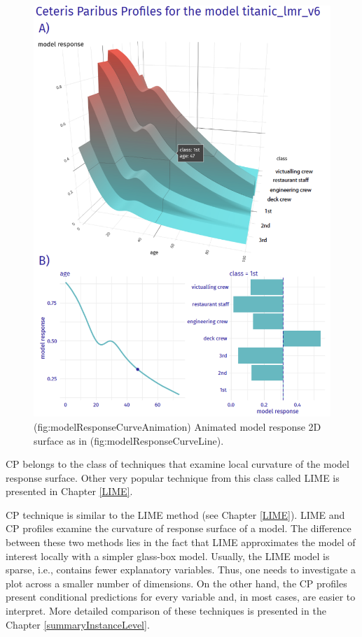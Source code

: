 \documentclass[12pt,]{krantz}
\begin{document}
\begin{figure}

{\centering \includegraphics[width=0.7\linewidth]{figure/profile_age_class} 

}

\caption{(fig:modelResponseCurveAnimation) Animated model response 2D surface as in (fig:modelResponseCurveLine).}\label{fig:modelResponseCurveAnimation}
\end{figure}

CP belongs to the class of techniques that examine local curvature of the model response surface. Other very popular technique from this class called LIME is presented in Chapter \ref{LIME}.

CP technique is similar to the LIME method (see Chapter \ref{LIME}). LIME and CP profiles examine the curvature of response surface of a model. The difference between these two methods lies in the fact that LIME approximates the model of interest locally with a simpler glass-box model. Usually, the LIME model is sparse, i.e., contains fewer explanatory variables. Thus, one needs to investigate a plot across a smaller number of dimensions. On the other hand, the CP profiles present conditional predictions for every variable and, in most cases, are easier to interpret. More detailed comparison of these techniques is presented in the Chapter \ref{summaryInstanceLevel}.
\end{document}
